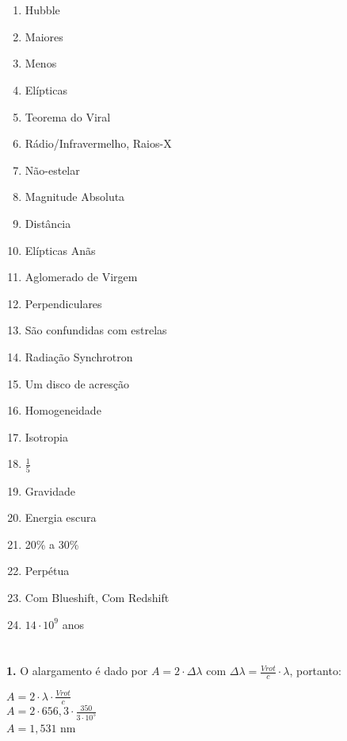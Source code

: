 \documentclass[12pt,letterpaper]{article}
\begin{document}
	\part{}
		\begin{multicols}{2}
			\begin{enumerate}
				\item Hubble
				\item Maiores
				\item Menos
				\item Elípticas
				\item Teorema do Viral
				\item Rádio/Infravermelho, Raios-X
				\item Não-estelar
				\item Magnitude Absoluta
				\item Distância
				\item Elípticas Anãs
				\item Aglomerado de Virgem
				\item Perpendiculares
				\item São confundidas com estrelas
				\item Radiação Synchrotron
				\item Um disco de acresção
				\item Homogeneidade
				\item Isotropia
				\item $\frac{1}{5}$
				\item Gravidade
				\item Energia escura
				\item 20\% a 30\%
				\item Perpétua
				\item Com Blueshift, Com Redshift
				\item $14 \cdot 10^9$ anos
			\end{enumerate}
		\end{multicols}	
	
	\part{}
		\textbf{1.} O alargamento é dado por $A = 2\cdot \Delta\lambda$ com $\Delta\lambda = \frac{V{rot}}{c}\cdot\lambda$, portanto:
		\begin{center}
			$A = 2\cdot\lambda\cdot\frac{V{rot}}{c}$\\
			$A = 2\cdot656,3\cdot\frac{350}{3\cdot10^5}$\\
			$A = 1,531$ nm
		\end{center} 
		
\end{document}
